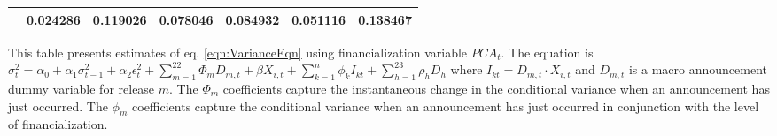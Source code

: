 \begin{sidewaystable}
{\begin{tabular}{@{}lllllllllllll@{}}
&\multicolumn{2}{c}{ 0.024286 }                                                 & \multicolumn{2}{c}{ 0.119026 }                                                 & \multicolumn{2}{c}{ 0.078046 }                                                 & \multicolumn{2}{c}{ 0.084932 }                                                 & \multicolumn{2}{c}{ 0.051116 }                                                   & \multicolumn{2}{c}{ 0.138467 }                                                 \\ \bottomrule 
\end{tabular}
}
\begin{tablenotes}\item 
        \singlespacing
        \footnotesize
        This table presents estimates of eq. \ref{eqn:VarianceEqn} using financialization variable $PCA_t$. The equation is $\sigma_{t}^2=\alpha_0+\alpha_1 \sigma_{t-1}^2+\alpha_2 \epsilon_t^2 +\sum_{m=1}^{22} \Phi_m D_{m,t}+\beta X_{i,t}+\sum_{k=1}^n \phi_k I_{kt} + \sum_{h=1}^{23} \rho_h D_h$ where $I_{kt}=D_{m,t} \cdot X_{i,t}$ and $D_{m,t}$ is a macro announcement dummy variable for release $m$. The $\Phi_m$ coefficients capture the instantaneous change in the conditional variance when an announcement has just occurred. The $\phi_m$ coefficients capture the conditional variance when an announcement has just occurred in conjunction with the level of financialization.
\end{tablenotes}
\end{sidewaystable}




